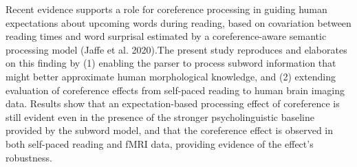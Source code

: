 Recent evidence supports a role for coreference processing in guiding human expectations about upcoming words during reading, based on covariation between reading times and word surprisal estimated by a coreference-aware semantic processing model (Jaffe et al. 2020).The present study reproduces and elaborates on this finding by (1) enabling the parser to process subword information that might better approximate human morphological knowledge, and (2) extending evaluation of coreference effects from self-paced reading to human brain imaging data. Results show that an expectation-based processing effect of coreference is still evident even in the presence of the stronger psycholinguistic baseline provided by the subword model, and that the coreference effect is observed in both self-paced reading and fMRI data, providing evidence of the effect's robustness.

